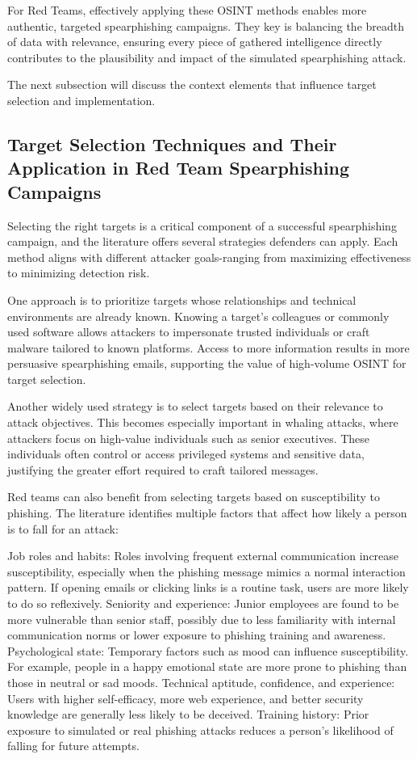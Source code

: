 For Red Teams, effectively applying these OSINT methods enables more authentic, targeted spearphishing campaigns. They key is balancing the breadth of data with relevance, ensuring every piece of gathered intelligence directly contributes to the plausibility and impact of the simulated spearphishing attack.

The next subsection will discuss the context elements that influence target selection and implementation.

\subsection{Target Selection Techniques and Their Application in Red Team Spearphishing Campaigns}
Selecting the right targets is a critical component of a successful spearphishing campaign, and the literature offers several strategies defenders can apply. Each method aligns with different attacker goals-ranging from maximizing effectiveness to minimizing detection risk.

One approach is to prioritize targets whose relationships and technical environments are already known.  Knowing a target's colleagues or commonly used software allows attackers to impersonate trusted individuals or craft malware tailored to known platforms. Access to more information results in more persuasive spearphishing emails, supporting the value of high-volume OSINT for target selection.

Another widely used strategy is to select targets based on their relevance to attack objectives. This becomes especially important in whaling attacks, where attackers focus on high-value individuals such as senior executives. These individuals often control or access privileged systems and sensitive data, justifying the greater effort required to craft tailored messages.

Red teams can also benefit from selecting targets based on susceptibility to phishing. The literature identifies multiple factors that affect how likely a person is to fall for an attack:

Job roles and habits: Roles involving frequent external communication increase susceptibility, especially when the phishing message mimics a normal interaction pattern. If opening emails or clicking links is a routine task, users are more likely to do so reflexively.
Seniority and experience: Junior employees are found to be more vulnerable than senior staff, possibly due to less familiarity with internal communication norms or lower exposure to phishing training and awareness.
Psychological state: Temporary factors such as mood can influence susceptibility. For example, people in a happy emotional state are more prone to phishing than those in neutral or sad moods.
Technical aptitude, confidence, and experience: Users with higher self-efficacy, more web experience, and better security knowledge are generally less likely to be deceived.
Training history: Prior exposure to simulated or real phishing attacks reduces a person's likelihood of falling for future attempts.

